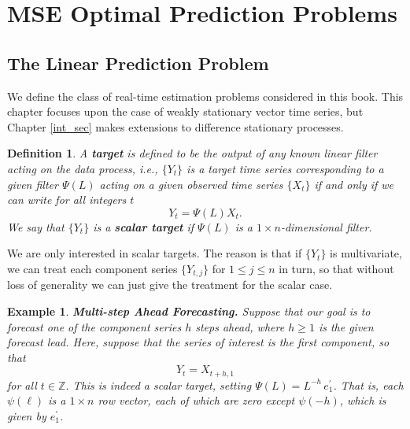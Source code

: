 \documentclass[a4paper]{book}
\def\ZZ{\mathbb Z}
\newtheorem{Definition}{Definition}
\newtheorem{Example}{Example}
\begin{document}
\section{MSE Optimal Prediction Problems}

\subsection{The Linear Prediction Problem} We define the class of
real-time estimation problems considered in this book.  This chapter
 focuses upon the case of weakly stationary vector time series, but
 Chapter \ref{int_sec} makes extensions to difference stationary processes.

\begin{Definition} \rm
\label{def:target}
 A {\bf target} is defined to be the output of any known linear
 filter acting on the data process, i.e.,  $\{Y_t \}$ is a target
 time series corresponding to a given filter $\Psi (L)$ acting on a 
given observed time series
 $\{ X_t \}$ if and only if we can write for all integers $t$
\[
 Y_t = \Psi (L) X_t.
\] 
 We say that $\{ Y_t \}$ is a {\bf scalar target} if $\Psi (L)$ is a
 $1 \times n$-dimensional filter.
\end{Definition}

We are only interested in scalar targets.  The reason is that if $\{ Y_t \}$
 is multivariate, we can treat each component series $\{ Y_{t,j} \}$ for
 $1 \leq j \leq n$ in turn, so that without loss of generality we
 can just give the treatment for the scalar case. 

\begin{Example} {\bf  Multi-step Ahead Forecasting.}   \rm
\label{exam:multi-step.fore}
  Suppose that our goal is to forecast one of the component series 
 $h$ steps ahead, where $h \geq 1$ is the given {\em forecast lead}.
  Here, suppose that the series of interest is the first component, so 
 that 
\[
  Y_t = X_{t+h,1}
\]
  for all $ t \in \ZZ$.  This is indeed a scalar target, setting
  $\Psi (L) = L^{-h} \, e_1^{\prime}$.  That is, each $\psi (\ell)$
 is a $1 \times n$ row vector, each of which are zero except $\psi (-h)$,
 which is given by $e_1^{\prime}$.
\end{Example}
\end{document}
